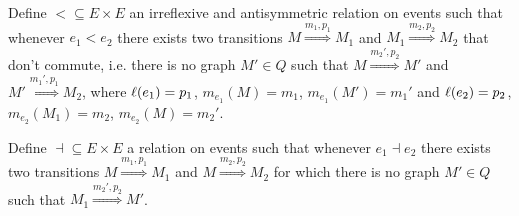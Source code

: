 \begin{definition}
\label{def:seq_dep}
  Define $< \subseteq E\times E$ an irreflexive and antisymmetric relation on events such that whenever $e_1 < e_2$ there exists two transitions $M\overset{m_1,p_1}{\Rightarrow} M_1$ and $M_1\overset{m_2,p_2}{\Rightarrow} M_2$ that don't commute, i.e. there is no graph $M'\in Q$ such that $M\overset{m_2',p_2}{\Rightarrow} M'$ and $M'\overset{m_1',p_1}{\Rightarrow} M_2$, where $\ell(e_1)=p_1$, $m_{e_1}(M) = m_1$, $m_{e_1}(M') = m_1'$ and $\ell(e_2)=p_2$, $m_{e_2}(M_1) = m_2$, $m_{e_2}(M) = m_2'$.
\end{definition}

\begin{definition}[Inhibition]
  Define $\dashv\subseteq E \times E$ a relation on events such that whenever $e_1\dashv e_2$ there exists two transitions $M\overset{m_1,p_1}{\Rightarrow} M_1$ and $M\overset{m_2,p_2}{\Rightarrow} M_2$ for which there is no graph $M'\in Q$ such that $M_1\overset{m_2',p_2}{\Rightarrow} M'$.
\end{definition}
